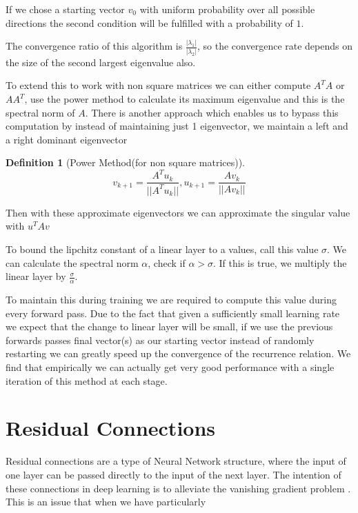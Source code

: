 \documentclass[12pt, a4paper]{report}
\theoremstyle{definition}
\theoremstyle{definition}
\newtheorem{definition}{Definition}[section]
\theoremstyle{definition}
\begin{document}
If we chose a starting vector $v_0$ with uniform probability over all possible directions the second condition will be fulfilled with a probability of $1$.

The convergence ratio of this algorithm is $\frac{|\lambda_1|}{|\lambda_2|}$, so the convergence rate depends on the size of the second largest eigenvalue also.


To extend this to work with non square matrices we can either compute $A^TA$ or $AA^T$, use the power method to calculate its maximum eigenvalue and this is the spectral norm of $A$.
There is another approach which enables us to bypass this computation by instead of maintaining just 1 eigenvector, we maintain a left and a right dominant eigenvector

\begin{definition}[Power Method(for non square matrices)]
    $$v_{k+1} = \frac{A^Tu_k}{||A^Tu_k||}, u_{k+1} = \frac{Av_k}{||Av_k||} $$
\end{definition}

Then with these approximate eigenvectors we can approximate the singular value with $u^T A v$

To bound the lipchitz constant of a linear layer to a values, call this value $\sigma$. We can calculate the spectral norm $\alpha$, check if $\alpha > \sigma$. If this is true, we multiply the linear layer by $\frac{\sigma}{\alpha}$.

To maintain this during training we are required to compute this value during every forward pass. Due to the fact that given a sufficiently small learning rate we expect that the change to linear layer will be small, if we use the previous forwards passes final vector(s) as our starting vector instead of randomly restarting we can greatly speed up the convergence of the recurrence relation. We find that empirically we can actually get very good performance with a single iteration of this method at each stage.


\section{Residual Connections}

Residual connections are a type of Neural Network structure, where the input of one layer can be passed directly to the input of the next layer. The intention of these connections in deep learning is to alleviate the vanishing gradient problem \cite{resnet}. This is an issue that when we have particularly
\end{document}
